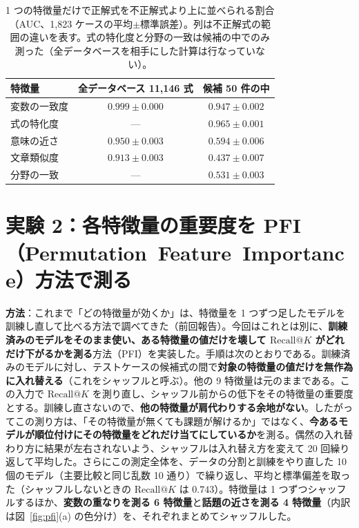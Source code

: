 \documentclass[a4j,dvipdfmx,11pt]{jresume}
\makeatletter
\newcommand{\rk}{\textrm{Recall@}K}
\makeatother
\begin{document}
\begin{table}[h]\centering
\small
\caption{1 つの特徴量だけで正解式を不正解式より上に並べられる割合（AUC、1{,}823 ケースの平均$\pm$標準誤差）。列は不正解式の範囲の違いを表す。式の特化度と分野の一致は候補の中でのみ測った（全データベースを相手にした計算は行なっていない）。}
\label{tab:auc}
\begin{tabular}{lcc}
\toprule
特徴量 & 全データベース 11{,}146 式 & 候補 50 件の中 \\
\midrule
変数の一致度 & $0.999 \pm 0.000$ & $0.947 \pm 0.002$ \\
式の特化度 & — & $0.965 \pm 0.001$ \\
\midrule
意味の近さ & $0.950 \pm 0.003$ & $0.594 \pm 0.006$ \\
文章類似度 & $0.913 \pm 0.003$ & $0.437 \pm 0.007$ \\
分野の一致 & — & $0.531 \pm 0.003$ \\
\bottomrule
\end{tabular}
\end{table}

\section{実験 2：各特徴量の重要度を \mbox{PFI（Permutation Feature Importance）}方法で測る}\label{sec:exp2}
\textbf{方法}：これまで「どの特徴量が効くか」は、特徴量を 1 つずつ足したモデルを訓練し直して比べる方法で調べてきた（前回報告）。今回はこれとは別に、\textbf{訓練済みのモデルをそのまま使い、ある特徴量の値だけを壊して $\rk$ がどれだけ下がるかを測る}方法（PFI）を実装した。手順は次のとおりである。訓練済みのモデルに対し、テストケースの候補式の間で\textbf{対象の特徴量の値だけを無作為に入れ替える}（これをシャッフルと呼ぶ）。他の 9 特徴量は元のままである。この入力で $\rk$ を測り直し、シャッフル前からの低下をその特徴量の重要度とする。訓練し直さないので、\textbf{他の特徴量が肩代わりする余地がない}。したがってこの測り方は、「その特徴量が無くても課題が解けるか」ではなく、\textbf{今あるモデルが順位付けにその特徴量をどれだけ当てにしているか}を測る。偶然の入れ替わり方に結果が左右されないよう、シャッフルは入れ替え方を変えて 20 回繰り返して平均した。さらにこの測定全体を、データの分割と訓練をやり直した 10 個のモデル（主要比較と同じ乱数 10 通り）で繰り返し、平均と標準偏差を取った（シャッフルしないときの $\rk$ は $0.743$）。特徴量は 1 つずつシャッフルするほか、\textbf{変数の重なりを測る 6 特徴量}と\textbf{話題の近さを測る 4 特徴量}（内訳は図~\ref{fig:pfi}(a) の色分け）を、それぞれまとめてシャッフルした。
\end{document}
